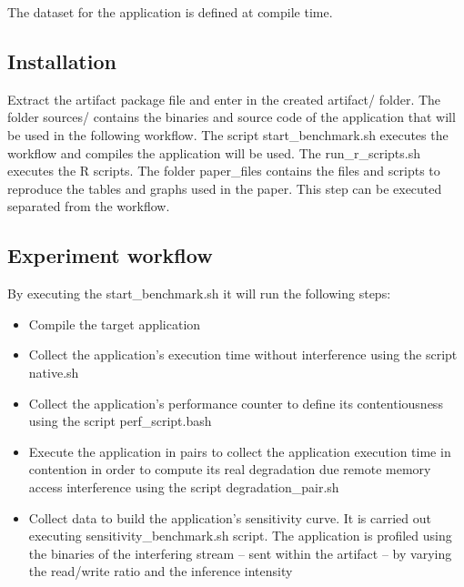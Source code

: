 \documentclass{sigplanconf}
\begin{document}
	The dataset for the application is defined at compile time.
	
	\subsection{Installation} 
	
	Extract the artifact package file and enter in the created \textsf{artifact/} folder.  The
	folder \textsf{sources/} contains the binaries and source code of the application that
	will be used in the following workflow. The script \textsf{start\_benchmark.sh} executes
	the workflow and compiles the application will be used. The \textsf{run\_r\_scripts.sh}
	executes the R scripts. The folder \textsf{paper\_files} contains the files and scripts to
	reproduce the tables and graphs used in the paper. This step can be executed separated
	from the workflow.
	
	\subsection{Experiment workflow} 
	
	By executing the \textsf{start\_benchmark.sh} it will run the following steps: 
	
	\begin{itemize} 
		
		\item Compile the target application
		
		\item Collect the application's execution time without interference using the script
		\textsf{native.sh}
		
		\item Collect the application's performance counter to define its contentiousness
		using the script \textsf{perf\_script.bash}
		
		\item Execute the application in pairs to collect the application execution time in
		contention in order to compute its real degradation due remote memory access
		interference using the script \textsf{degradation\_pair.sh}
		
		\item Collect data to build the application's sensitivity curve. It is carried out
		executing \textsf{sensitivity\_benchmark.sh} script. The application is profiled
		using the binaries of the interfering stream -- sent within the artifact
		-- by varying the read/write ratio and the inference intensity
		
	\end{itemize} 
	
\end{document}
